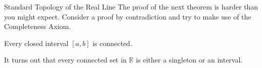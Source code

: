 \begin{section}{Standard Topology of the Real Line}
The proof of the next theorem is harder than you might expect. Consider a proof by contradiction and try to make use of the Completeness Axiom.

\begin{theorem}\label{thm:closed interval connected}
Every closed interval $[a,b]$ is connected.
\end{theorem}

It turns out that every connected set in $\mathbb{R}$ is either a singleton or an interval.

\end{section}